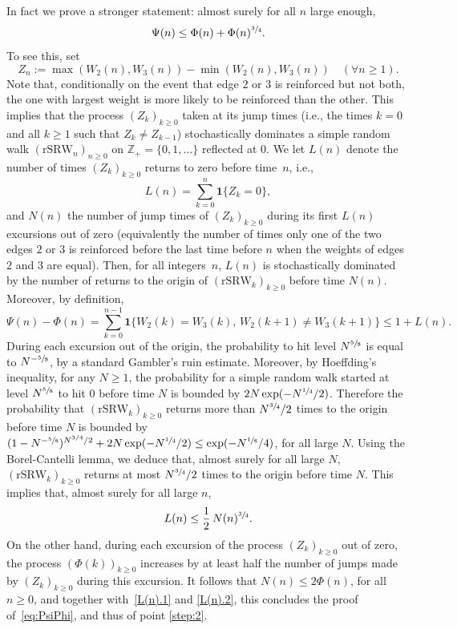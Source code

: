\documentclass[11pt]{article}
\newcommand{\ie}{i.e.,\xspace}
\let \nicefrac\sfrac
\numberwithin{equation}{section}
\theoremstyle{definition}
\let\bs\boldsymbol
\begin{document}
In fact we prove a stronger statement: almost surely for all $n$ large enough,
\begin{equation}\label{eq:PsiPhi}
\Psi(n) \le \Phi(n) + \Phi(n)^{\nicefrac34}.
\end{equation}
To see this, set
\[
Z_n := \max(W_2(n) , W_3(n)) - \min(W_2(n),W_3(n))\quad (\forall n\geq 1).
\]
Note that, conditionally on the event that edge $2$ or $3$ is reinforced but not both,
the one with largest weight is more likely to be reinforced than the other.
This implies that the process $(Z_k)_{k\ge 0}$ taken at its jump times (\ie the times $k=0$ and all $k\geq 1$ such that $Z_k\neq Z_{k-1}$)
stochastically dominates a simple random walk $(\mathrm{rSRW}_n)_{n\geq 0}$
on $\mathbb Z_+=\{0,1,\dots\}$ reflected at $0$.
We let $L(n)$ denote the number of times $(Z_k)_{k\ge 0}$ returns to zero before time~$n$, \ie
\[
L(n) = \sum_{k=0}^n \bs 1\{Z_k = 0\},
\]
and $N(n)$ the number of jump times of $(Z_k)_{k\ge 0}$ during its first $L(n)$ excursions out of zero
(equivalently the number of times only one of the two edges $2$ or $3$ is reinforced before the last time before $n$ when the weights of edges $2$ and $3$ are equal).
Then, for all integers~$n$, $L(n)$ is stochastically dominated by the number of returns to the origin of $(\mathrm{rSRW}_k)_{k\geq 0}$ before time $N(n)$.
Moreover, by definition,
\begin{equation}\label{L(n).1}
\Psi(n) - \Phi(n) = \sum_{k=0}^{n-1} \bs 1\{W_2(k) = W_3(k), \, W_2(k+1)\neq W_3(k+1)\} \le 1+ L(n).
\end{equation}
During each excursion out of the origin,
the probability to hit level $N^{\nicefrac58}$ is equal to $N^{-\nicefrac58}$, by a standard Gambler's ruin estimate. Moreover, by Hoeffding's inequality, for any $N\ge 1$,
the probability for a simple random walk started at level $N^{\nicefrac58}$ to hit $0$ before time $N$ is bounded by $2N\exp(-N^{\nicefrac14}/2)$.
Therefore the probability that
$(\mathrm{rSRW}_k)_{k\geq 0}$ returns more than $N^{\nicefrac34}/2$ times to the origin before time $N$ is bounded by $(1-N^{-\nicefrac58})^{N^{3/4}/2}+2N\exp(-N^{\nicefrac14}/2) \le \exp(-N^{\nicefrac18}/4)$, for all large $N$.
Using {the} Borel-Cantelli lemma, we deduce that, almost surely for all large $N$, $(\mathrm{rSRW}_k)_{k\geq 0}$ returns at most $N^{\nicefrac34}/2$ times to the origin before time $N$.
This implies that,
almost surely for all large $n$,
\begin{equation}\label{L(n).2}
L(n) \le \frac12\, N(n)^{\nicefrac 34}.
\end{equation}
On the other hand, during each excursion of the process $(Z_k)_{k\ge 0}$ out of zero, the process $(\Phi(k))_{k\ge 0}$ increases by at least half the number of jumps made by $(Z_k)_{k\ge 0}$ during this excursion. It follows that $N(n)\le 2\Phi(n)$, for all $n\ge 0$, and together with~\eqref{L(n).1} and \eqref{L(n).2}, this concludes the proof of~\eqref{eq:PsiPhi}, and thus of point \eqref{step:2}.
\end{document}
